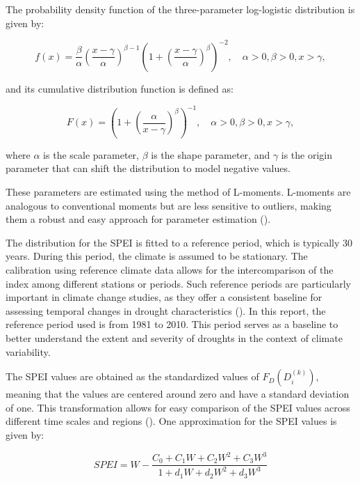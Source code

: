 \documentclass[
]{krantz}
\begin{document}
The probability density function of the three-parameter log-logistic distribution is given by:

\begin{equation}
f(x) = \frac{\beta}{\alpha} \left( \frac{x - \gamma}{\alpha} \right)^{\beta - 1} \left( 1 + \left( \frac{x - \gamma}{\alpha} \right)^{\beta} \right)^{-2}, \quad \alpha > 0, \beta > 0, x > \gamma,
\end{equation}

and its cumulative distribution function is defined as:

\begin{equation}
F(x) = \left( 1 + \left( \frac{\alpha}{x - \gamma} \right)^{\beta} \right)^{-1}, \quad \alpha > 0, \beta > 0, x > \gamma,
\end{equation}

where \(\alpha\) is the scale parameter, \(\beta\) is the shape parameter, and \(\gamma\) is the origin parameter that can shift the distribution to model negative values.

These parameters are estimated using the method of L-moments. L-moments are analogous to conventional moments but are less sensitive to outliers, making them a robust and easy approach for parameter estimation (\citet{vicente}).

The distribution for the SPEI is fitted to a reference period, which is typically 30 years. During this period, the climate is assumed to be stationary. The calibration using reference climate data allows for the intercomparison of the index among different stations or periods. Such reference periods are particularly important in climate change studies, as they offer a consistent baseline for assessing temporal changes in drought characteristics (\citet{um2017}).
In this report, the reference period used is from 1981 to 2010. This period serves as a baseline to better understand the extent and severity of droughts in the context of climate variability.

The SPEI values are obtained as the standardized values of \(F_D(D_i^{(k)})\), meaning that the values are centered around zero and have a standard deviation of one. This transformation allows for easy comparison of the SPEI values across different time scales and regions (\citet{vicente}).
One approximation for the SPEI values is given by:

\begin{equation}
SPEI = W - \frac{C_0 + C_1W + C_2W^2 + C_3W^3}{1 + d_1W + d_2W^2 + d_3W^3}
\end{equation}
\end{document}
